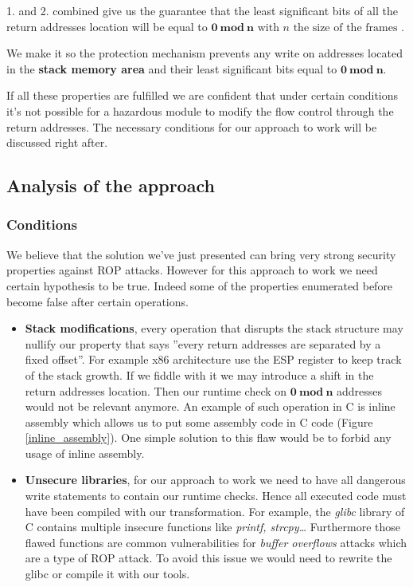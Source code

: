 \documentclass[11pt]{sdm}
\begin{document}
1. and 2. combined give us the guarantee that the least significant bits of all the return addresses location will be equal to $\mathbf{0~mod~n} \text{ with } n \text{ the size of the frames }$.

\hfill \break 
We make it so the protection mechanism prevents any write on addresses located in the \textbf{stack memory area} and their least significant bits equal to $\mathbf{0~mod~n}$.

\hfill \break 
If all these properties are fulfilled we are confident that under certain conditions it's not possible for a hazardous module to modify the flow control through the return addresses.
The necessary conditions for our approach to work will be discussed right after.

\subsection{Analysis of the approach}
\label{sub:Analysis of the approach}


\subsubsection{Conditions}
\label{ssub:Conditions}

We believe that the solution we've just presented can bring very strong security properties against ROP attacks. However for this approach to work we need certain hypothesis to be true. Indeed some of the properties enumerated before become false after certain operations.

\begin{itemize}
	\item \textbf{Stack modifications}, every operation that disrupts the stack structure may nullify our property that says ''every return addresses are separated by a fixed offset''. For example x86 architecture use the ESP register to keep track of the stack growth. If we fiddle with it we may introduce a shift in the return addresses location. Then our runtime check on $\mathbf{0~mod~n}$ addresses would not be relevant anymore.
		An example of such operation in C is inline assembly which allows us to put some assembly code in C code (Figure \ref{inline_assembly}). One simple solution to this flaw would be to forbid any usage of inline assembly.

	\item \textbf{Unsecure libraries}, for our approach to work we need to have all dangerous write statements to contain our runtime checks. Hence all executed code must have been compiled with our transformation. For example, the \textit{glibc} library of C contains multiple insecure functions like \textit{printf, strcpy\dots} Furthermore those flawed functions are common vulnerabilities for \textit{buffer overflows} attacks which are a type of ROP attack. To avoid this issue we would need to rewrite the glibc or compile it with our tools.
\end{itemize}
\end{document}
